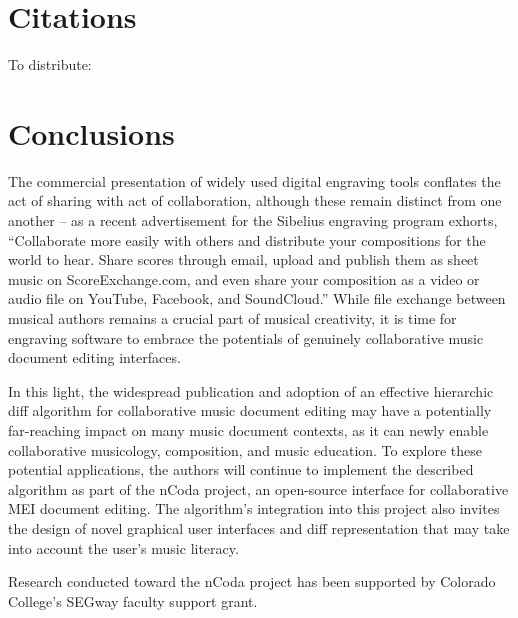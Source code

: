 \documentclass{article}
\begin{document}
\section{Citations}
To distribute: \cite{Bille:2005ec,Chawathe:1996jb,Cobena:2002gd,Designs:qm,Martin:2015pb,McCulloch:2015pd,roland2002music,Zhang:1989ec,Zhang:1989il}

\section{Conclusions}
The commercial presentation of widely used digital engraving tools conflates the act of sharing with act of collaboration, although these remain distinct from one another -- as a recent advertisement for the Sibelius engraving program exhorts, ``Collaborate more easily with others and distribute your compositions for the world to hear. Share scores through email, upload and publish them as sheet music on ScoreExchange.com, and even share your composition as a video or audio file on YouTube, Facebook, and SoundCloud.'' While file exchange between musical authors remains a crucial part of musical creativity, it is time for engraving software to embrace the potentials of genuinely collaborative music document editing interfaces.

In this light, the widespread publication and adoption of an effective hierarchic diff algorithm for collaborative music document editing may have a potentially far-reaching impact on many music document contexts, as it can newly enable collaborative musicology, composition, and music education. To explore these potential applications, the authors will continue to implement the described algorithm as part of the nCoda project, an open-source interface for collaborative MEI document editing. The algorithm's integration into this project also invites the design of novel graphical user interfaces and diff representation that may take into account the user's music literacy.

%
\begin{acknowledgments}
Research conducted toward the nCoda project has been supported by Colorado College's SEGway faculty support grant.
\end{acknowledgments} 

\balance

\end{document}
